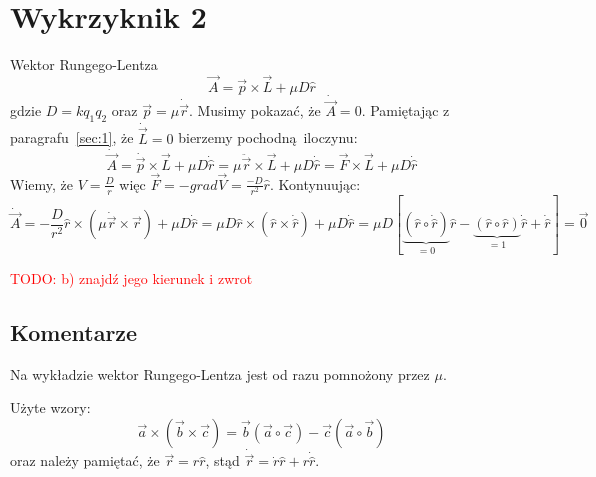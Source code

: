 \documentclass[a4paper,12pt]{article}
\newcommand\myworries[1]{\textcolor{red}{#1}} %
\begin{document}
\section{Wykrzyknik 2}
Wektor Rungego-Lentza
\[
  \vec{A} = \vec{p} \times \vec{L} + \mu D \hat{r}
\]
gdzie $D = kq_1q_2$ oraz $\vec{p} = \mu \dot{\vec{r}}$.
Musimy pokazać, że $\dot{\vec{A}} = 0$. Pamiętając z paragrafu~\ref{sec:1}, że
$\dot{\vec{L}} = 0$ bierzemy pochodną iloczynu:
\[
  \dot{\vec{A}} = \dot{\vec{p}} \times \vec{L} + \mu D \dot{\hat{r}} = \mu
  \ddot{\vec{r}} \times \vec{L} + \mu D \dot{\hat{r}} = \vec{F} \times \vec{L} +
  \mu D \dot{\hat{r}}
\]
Wiemy, że $V = \frac{D}{r}$ więc $\vec{F} = -grad\vec{V} =
\frac{-D}{r^2}\hat{r}$. Kontynuując:
\[
  \dot{\vec{A}} = -\frac{D}{r^2}\hat{r} \times \left( \mu \dot{\vec{r}} \times
  \vec{r} \right) + \mu D \dot{\hat{r}} = \mu D\hat{r} \times \left(
  \hat{r} \times
  \dot{\hat{r}} \right) + \mu D \dot{\hat{r}} = \mu D \left[\underbrace{\left( \hat{r} \circ
    \dot{\hat{r}} \right)}_{=0} \hat{r} - \underbrace{\left( \hat{r} \circ \hat{r}
  \right)}_{=1}
\dot{\hat{r}} + \dot{\hat{r}} \right] = \vec{0}
\]

\myworries{TODO: b) znajdź jego kierunek i zwrot}

\subsection{Komentarze}
Na wykładzie wektor Rungego-Lentza jest od razu pomnożony przez $\mu$.

Użyte wzory:
\[
		\vec{a}\times(\vec{b}\times\vec{c}) = \vec{b} (\vec{a}\circ\vec{c}) -
    \vec{c}(\vec{a}\circ\vec{b})
\]
oraz należy pamiętać, że $\vec{r} = r\hat{r}$, stąd $\dot{\vec{r}} =
\dot{r}\hat{r} + r\dot{\hat{r}}$.
\end{document}
